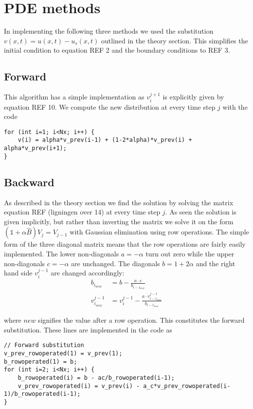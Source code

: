 \documentclass[norsk,a4paper,11pt]{article}
\begin{document}

\section{PDE methods}
In implementing the following three methods we used the substitution $v(x, t) = u(x, t) - u_s(x,t)$
outlined in the theory section. This simplifies the initial condition to equation REF 2 and the boundary
conditions to REF 3.

\subsection{Forward}
This algorithm has a simple implementation as $v_{i}^{j+1}$ is explicitly given by equation REF 10.
We compute the new distribution at every time step $j$ with the code
\begin{lstlisting}
for (int i=1; i<Nx; i++) {
    v(i) = alpha*v_prev(i-1) + (1-2*alpha)*v_prev(i) + alpha*v_prev(i+1);
}
\end{lstlisting}

\subsection{Backward}
As described in the theory section we find the solution by solving the matrix
equation REF (ligningen over 14) at every time step $j$. As seen the solution is given implicitly, but
rather than inverting the matrix we solve it on the form $(\mathbb{1}+\alpha\hat{B})V_{j} = V_{j-1}$
with Gaussian elimination using row operations.
The simple form of the three diagonal matrix means that the row operations are fairly easily implemented.
The lower non-diagonals $a=-\alpha$ turn out zero while the upper non-diagonals $c=-\alpha$ are unchanged. 
The diagonals $b = 1 + 2\alpha$ and the right hand side $v_i^{j-1}$ are changed accordingly:
\begin{align}
     b_{i_{new}} & = b - \frac{a \cdot c}{b_{{i-1}_{new}}} \\
     v_{i_{new}}^{j-1} & = v_i^{j-1} - \frac{a\cdot v_{{i-1}_{new}}^{j-1}}{b_{{i-1}_{new}}}
\end{align}


where $new$ signifies the value after a row operation. This constitutes the forward substitution.
These lines are implemented in the code as
\begin{lstlisting}
// Forward substitution
v_prev_rowoperated(1) = v_prev(1);
b_rowoperated(1) = b;
for (int i=2; i<Nx; i++) {
    b_rowoperated(i) = b - ac/b_rowoperated(i-1);
    v_prev_rowoperated(i) = v_prev(i) - a_c*v_prev_rowoperated(i-1)/b_rowoperated(i-1);
}
\end{lstlisting}
\end{document}
